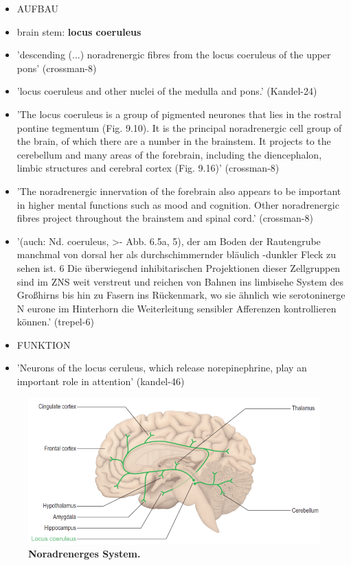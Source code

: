 \documentclass[12pt,a4paper,pdftex]{article}
\begin{document}
\begin{itemize}
    \item AUFBAU
    \item brain stem: \textbf{locus coeruleus}
    \item 'descending (...) noradrenergic fibres from the locus coeruleus of the upper pons' (crossman-8)
    \item 'locus coeruleus and other nuclei of the medulla and pons.' 
    (Kandel-24)
    \item 'The locus coeruleus is a group of pigmented neurones that lies in the rostral pontine tegmentum (Fig. 9.10). It is the principal noradrenergic cell group of the brain, of which there are a number in the brainstem. It projects to the cerebellum and many areas of the forebrain, including the diencephalon, limbic structures and cerebral cortex (Fig. 9.16)' (crossman-8)
    \item 'The noradrenergic innervation of the forebrain also appears to be important in higher mental functions such as mood and cognition. Other noradrenergic fibres project throughout the brainstem and spinal cord.' (crossman-8)
    \item '(auch: Nd. coeruleus, >- Abb. 6.5a, 5), der am Boden der Rautengrube manchmal von dorsal her als durchschimmernder bläulich -dunkler Fleck zu sehen ist. 6 Die überwiegend inhibitarischen Projektionen dieser Zellgruppen sind im ZNS weit verstreut und reichen von Bahnen ins limbisehe System des Großhirns bis hin zu Fasern ins Rückenmark, wo sie ähnlich wie serotoninerge N eurone im Hinterhorn die Weiterleitung sensibler Afferenzen kontrollieren können.' (trepel-6)
    \item FUNKTION
    \item 'Neurons of the locus ceruleus, which release norepinephrine, play an important role in attention' (kandel-46)
\end{itemize}

\begin{figure}[H]
    \centering
    \includegraphics[width=\textwidth]{pictures/Bilder_monoamine_systeme/noradrenerges_system.PNG}
    \caption[Noradrenerges System]{\textbf{Noradrenerges System.}}
    \label{fig:noradrenerges_system}
\end{figure}{}
\end{document}
